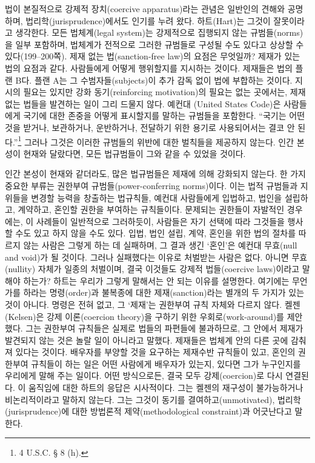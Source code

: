 법이 본질적으로 강제적 장치(coercive apparatus)라는 관념은 일반인의
견해와 공명하며, 법리학(jurisprudence)에서도 인기를 누려 왔다.
하트(Hart)는 그것이 잘못이라고 생각한다. 모든 법체계(legal system)는
강제적으로 집행되지 않는 규범들(norms)을 일부 포함하며, 법체계가
전적으로 그러한 규범들로 구성될 수도 있다고 상상할 수 있다(199--200쪽).
제재 없는 법(sanction-free law)의 요점은 무엇일까? 제재가 있는 법의
요점과 같다. 사람들에게 어떻게 행위할지를 지시하는 것이다. 제재들은 법의
플랜 B다. 플랜 A는 그 수범자들(subjects)이 추가 감독 없이 법에 부합하는
것이다. 지시의 필요는 있지만 강화 동기(reinforcing motivation)의 필요는
없는 곳에서는, 제재 없는 법들을 발견하는 일이 그리 드물지 않다. 예컨대
(United States Code)은 사람들에게 국기에 대한 존중을
어떻게 표시할지를 말하는 규범들을 포함한다. “국기는 어떤 것을 받거나,
보관하거나, 운반하거나, 전달하기 위한 용기로 사용되어서는 결코 안
된다.”\footnote{4 U.S.C. § 8 (h).} 그러나 그것은 이러한 규범들의 위반에
대한 벌칙들을 제공하지 않는다. 인간 본성이 현재와 달랐다면, 모든
법규범들이 그와 같을 수 있었을 것이다.

인간 본성이 현재와 같더라도, 많은 법규범들은 제재에 의해 강화되지
않는다. 한 가지 중요한 부류는 권한부여 규범들(power-conferring
norms)이다. 이는 법적 규범들과 지위들을 변경할 능력을 창출하는 법규칙들,
예컨대 사람들에게 입법하고, 법인을 설립하고, 계약하고, 혼인할 권한을
부여하는 규칙들이다. 문제되는 권한들이 자발적인 경우에는, 이 사례들이
일반적으로 그러하듯이, 사람들은 자기 선택에 따라 그것들을 행사할 수도
있고 하지 않을 수도 있다. 입법, 법인 설립, 계약, 혼인을 위한 법의 절차를
따르지 않는 사람은 그렇게 하는 데 실패하며, 그 결과 생긴 ‘혼인’은 예컨대
무효(null and void)가 될 것이다. 그러나 실패했다는 이유로 처벌받는
사람은 없다. 아니면 무효(nullity) 자체가 일종의 처벌이며, 결국 이것들도
강제적 법들(coercive laws)이라고 말해야 하는가? 하트는 우리가 그렇게
말해서는 안 되는 이유를 설명한다. 여기에는 무언가를 하라는 명령(order)과
불복종에 대한 제재(sanction)라는 별개의 두 가지가 있는 것이 아니다.
명령은 전혀 없고, 그 ‘제재’는 권한부여 규칙 자체와 다르지 않다.
켈젠(Kelsen)은 강제 이론(coercion theory)을 구하기 위한
우회로(work-around)를 제안했다. 그는 권한부여 규칙들은 실제로 법들의
파편들에 불과하므로, 그 안에서 제재가 발견되지 않는 것은 놀랄 일이
아니라고 말했다. 제재들은 법체계 안의 다른 곳에 감춰져 있다는 것이다.
배우자를 부양할 것을 요구하는 제재수반 규칙들이 있고, 혼인의 권한부여
규칙들이 하는 일은 어떤 사람에게 배우자가 있는지, 있다면 그가 누구인지를
우리에게 말해 주는 일이다. 어떤 방식으로든, 결국 모두 강제(coercion)로
다시 연결된다. 이 움직임에 대한 하트의 응답은 시사적이다. 그는 켈젠의
재구성이 불가능하거나 비논리적이라고 말하지 않는다. 그는 그것이 동기를
결여하고(unmotivated), 법리학(jurisprudence)에 대한 방법론적
제약(methodological constraint)과 어긋난다고 말한다.

